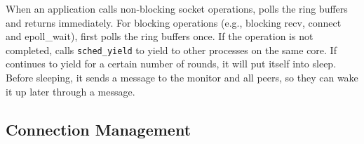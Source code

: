 When an application calls non-blocking socket operations, \libipc{} polls the ring buffers and returns immediately. For blocking operations (e.g., blocking recv, connect and epoll\_wait), \libipc{} first polls the ring buffers once. If the operation is not completed, \libipc{} calls \texttt{sched\_yield} to yield to other processes on the same core. %
If \libipc{} continues to yield for a certain number of rounds, it will put itself into sleep. Before sleeping, it sends a message to the monitor and all peers, so they can wake it up later through a message.




\subsection{Connection Management}
\label{subsec:connection-management}


